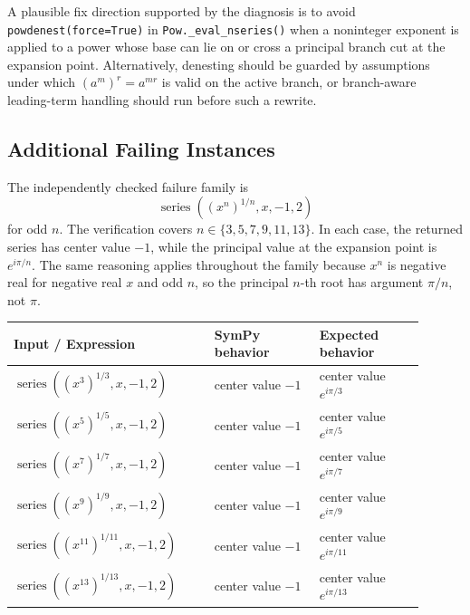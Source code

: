 \documentclass[11pt]{article}
\begin{document}
A plausible fix direction supported by the diagnosis is to avoid \texttt{powdenest(force=True)} in \texttt{Pow.\_eval\_nseries()} when a noninteger exponent is applied to a power whose base can lie on or cross a principal branch cut at the expansion point.  Alternatively, denesting should be guarded by assumptions under which \((a^m)^r = a^{mr}\) is valid on the active branch, or branch-aware leading-term handling should run before such a rewrite.

\subsection{Additional Failing Instances}

The independently checked failure family is
\[
    \operatorname{series}\left((x^n)^{1/n}, x, -1, 2\right)
\]
for odd \(n\).  The verification covers \(n \in \{3,5,7,9,11,13\}\).  In each case, the returned series has center value \(-1\), while the principal value at the expansion point is \(e^{i\pi/n}\).  The same reasoning applies throughout the family because \(x^n\) is negative real for negative real \(x\) and odd \(n\), so the principal \(n\)-th root has argument \(\pi/n\), not \(\pi\).

\begin{center}
\small
\renewcommand{\arraystretch}{1.3}
\begin{tabular}{@{}>{\raggedright\arraybackslash}p{0.44\linewidth}>{\raggedright\arraybackslash}p{0.23\linewidth}>{\raggedright\arraybackslash}p{0.23\linewidth}@{}}
\toprule
\textbf{Input / Expression} & \textbf{SymPy behavior} & \textbf{Expected behavior} \\
\midrule
\(\operatorname{series}((x^3)^{1/3}, x, -1, 2)\) & center value \(-1\) & center value \(e^{i\pi/3}\) \\
\(\operatorname{series}((x^5)^{1/5}, x, -1, 2)\) & center value \(-1\) & center value \(e^{i\pi/5}\) \\
\(\operatorname{series}((x^7)^{1/7}, x, -1, 2)\) & center value \(-1\) & center value \(e^{i\pi/7}\) \\
\(\operatorname{series}((x^9)^{1/9}, x, -1, 2)\) & center value \(-1\) & center value \(e^{i\pi/9}\) \\
\(\operatorname{series}((x^{11})^{1/11}, x, -1, 2)\) & center value \(-1\) & center value \(e^{i\pi/11}\) \\
\(\operatorname{series}((x^{13})^{1/13}, x, -1, 2)\) & center value \(-1\) & center value \(e^{i\pi/13}\) \\
\bottomrule
\end{tabular}
\end{center}
\end{document}
